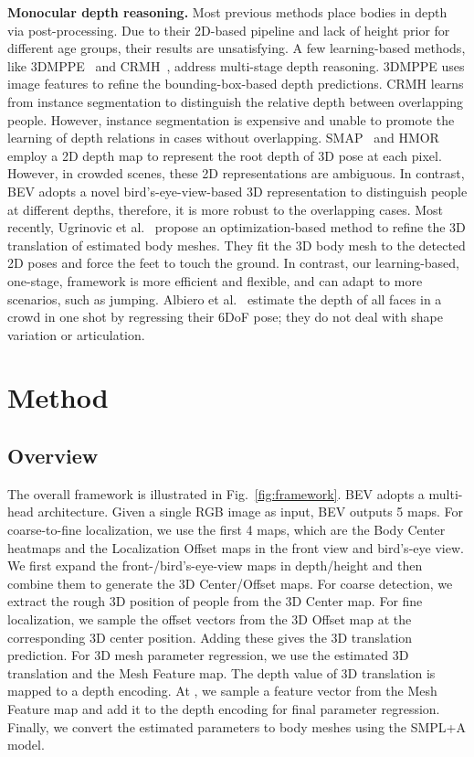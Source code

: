 \documentclass[10pt,twocolumn,letterpaper]{article}
\begin{document}
\textbf{Monocular depth reasoning. } 
Most previous methods place bodies in depth via post-processing.
Due to their 2D-based pipeline and lack of height prior for different age groups, their results are unsatisfying.
A few learning-based methods, like 3DMPPE~\cite{moon2019camera} and CRMH~\cite{jiang2020coherent}, address multi-stage depth reasoning. 
3DMPPE uses image features to refine the bounding-box-based depth predictions.
CRMH learns from instance segmentation to distinguish the relative depth between overlapping people. 
However, instance segmentation is expensive and unable to promote the learning of depth relations in cases without overlapping.
SMAP~\cite{zhen2020smap} and HMOR~\cite{wang2020hmor} employ a 2D depth map to represent the root depth of 3D pose at each pixel. 
However, in crowded scenes, these 2D representations are ambiguous.
In contrast, BEV adopts a novel bird's-eye-view-based 3D representation to distinguish people at different depths, therefore, it is more robust to the overlapping cases.
Most recently, Ugrinovic et al.~\cite{ugrinovic2021body} propose an optimization-based method to refine the 3D translation of estimated body meshes.
They fit the 3D body mesh to the detected 2D poses and force the feet to touch the ground. 
In contrast, our learning-based, one-stage, framework is more efficient and flexible, and can adapt to more scenarios, such as jumping.
Albiero et al.~\cite{albiero2021img2pose} estimate the depth of all faces in a crowd in one shot by regressing their 6DoF pose; they do not deal with shape variation or articulation.




\section{Method}
\label{sec:method}

\subsection{Overview}\label{sec:overview}

The overall framework is illustrated in Fig.~\ref{fig:framework}.
BEV adopts a multi-head architecture. 
Given a single RGB image as input, BEV outputs 5 maps.
For coarse-to-fine localization, we use the first 4 maps, which are the Body Center heatmaps and the Localization Offset maps in the front view and bird's-eye view. 
We first expand the front-/bird's-eye-view maps in depth/height  and then combine them to generate the 3D Center/Offset maps.
For coarse detection, we extract the rough 3D position of people from the 3D Center map. 
For fine localization, we sample the offset vectors from the 3D Offset map at the corresponding 3D center position. 
Adding these gives the 3D translation prediction.
For 3D mesh parameter regression, we use the estimated 3D translation  and the Mesh Feature map.
The depth value  of 3D translation is mapped to a depth encoding.
At , we sample a feature vector from the Mesh Feature map and add it to the depth encoding for final parameter regression.
Finally, we convert the estimated parameters to body meshes using the SMPL+A model.
\end{document}
